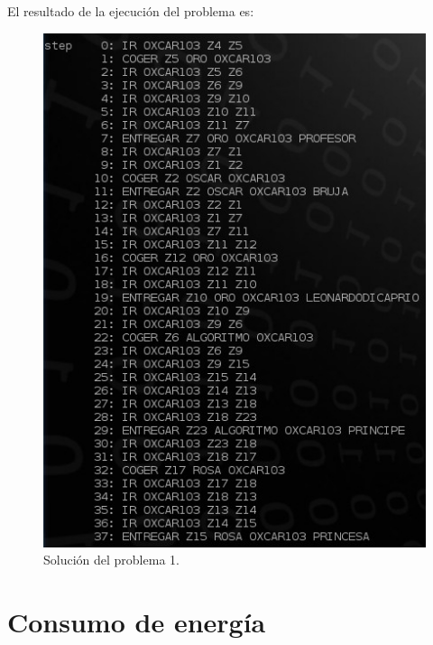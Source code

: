 \documentclass[a4paper, 11pt]{article}
\begin{document}
		El resultado de la ejecución del problema es:
		\begin{figure}[H]
			\centering
			\includegraphics[width=15cm]{Problema1.jpg}
			\caption{Solución del problema 1.}
			\label{Prob-1}
		\end{figure}
		
\section{Consumo de energía}
\end{document}

